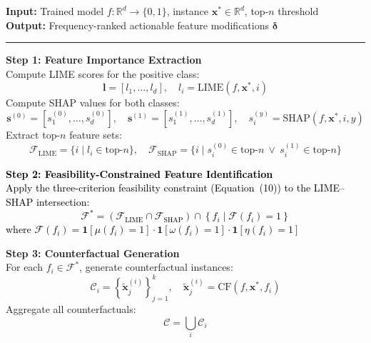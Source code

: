 \documentclass[a4paper,fleqn]{cas-sc}
\begin{document}
\begin{algorithm}[H]
\caption{LSC-XAI: LIME--SHAP--Counterfactual Explainable AI}
\label{alg:lscxai}
\vspace{1mm}
\textbf{Input:} Trained model $f : \mathbb{R}^d \rightarrow \{0,1\}$, instance $\mathbf{x}^* \in \mathbb{R}^d$, top-$n$ threshold\\
\textbf{Output:} Frequency-ranked actionable feature modifications $\boldsymbol{\delta}$
\vspace{1mm}
\hrule
\vspace{1mm}

\textbf{Step 1: Feature Importance Extraction}\\
Compute LIME scores for the positive class:
\begin{equation*}
    \mathbf{l} = [l_1, \dots, l_d], \quad l_i = \text{LIME}(f, \mathbf{x}^*, i)
\end{equation*}
Compute SHAP values for both classes:
\begin{equation*}
    \mathbf{s}^{(0)} = [s_1^{(0)}, \dots, s_d^{(0)}], \quad
    \mathbf{s}^{(1)} = [s_1^{(1)}, \dots, s_d^{(1)}], \quad
    s_i^{(y)} = \text{SHAP}(f, \mathbf{x}^*, i, y)
\end{equation*}
Extract top-$n$ feature sets:
\begin{equation*}
    \mathcal{F}_{\text{LIME}} = \{i \mid l_i \in \text{top-}n\}, \quad
    \mathcal{F}_{\text{SHAP}} = \{i \mid s_i^{(0)} \in \text{top-}n \ \vee \ s_i^{(1)} \in \text{top-}n\}
\end{equation*}

\vspace{1mm}
\textbf{\textcolor{black}{Step 2: Feasibility-Constrained Feature Identification}}\\
\textcolor{black}{Apply the three-criterion feasibility constraint (Equation~(10)) to the LIME--SHAP intersection:}
\textcolor{black}{\begin{equation*}
    \mathcal{F}^* = \left(\mathcal{F}_{\text{LIME}} \cap \mathcal{F}_{\text{SHAP}}\right) \cap 
    \left\{f_i \mid \mathcal{F}(f_i) = 1\right\}
\end{equation*}}
\textcolor{black}{where $\mathcal{F}(f_i) = \mathbf{1}[\mu(f_i){=}1] \cdot \mathbf{1}[\omega(f_i){=}1] \cdot \mathbf{1}[\eta(f_i){=}1]$}

\vspace{5mm}
\textbf{Step 3: Counterfactual Generation}\\
For each $f_i \in \mathcal{F}^*$, generate counterfactual instances:
\begin{equation*}
    \mathcal{C}_i = \left\{\tilde{\mathbf{x}}_j^{(i)}\right\}_{j=1}^{k}, \quad
    \tilde{\mathbf{x}}_j^{(i)} = \text{CF}(f, \mathbf{x}^*, f_i)
\end{equation*}
Aggregate all counterfactuals:
\begin{equation*}
    \mathcal{C} = \bigcup_{i} \mathcal{C}_i
\end{equation*}


\end{algorithm}
\end{document}
